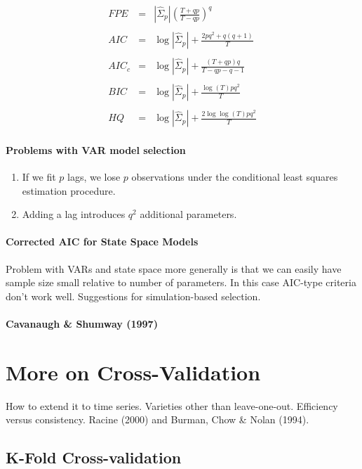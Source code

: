 \documentclass[12pt]{article}
\theoremstyle{definition}
\begin{document}
\begin{eqnarray*}
	FPE &=& \left| \widehat{\Sigma}_p \right| \left( \frac{T + qp}{T - qp}\right)^q\\ \\
	AIC &=& \log \left| \widehat{\Sigma}_p\right| + \frac{2pq^2 + q(q+1)}{T}\\ \\ 
	AIC_c &=& \log \left| \widehat{\Sigma}_p\right|  + \frac{(T + qp)q}{T - qp - q -1}\\ \\
	BIC &=& \log \left| \widehat{\Sigma}_p\right| +  \frac{\log(T)pq^2}{T}\\ \\ 
	HQ &=& \log \left| \widehat{\Sigma}_p\right| +  \frac{2 \log\log(T)pq^2}{T}
\end{eqnarray*}

\paragraph{Problems with VAR model selection}
	\begin{enumerate}
		\item If we fit $p$ lags, we lose $p$ observations under the conditional least squares estimation procedure.
		\item Adding a lag introduces $q^2$ additional parameters. 
	\end{enumerate}

\paragraph{Corrected AIC for State Space Models}
Problem with VARs and state space more generally is that we can easily have sample size small relative to number of parameters. In this case AIC-type criteria don't work well. Suggestions for simulation-based selection.

\paragraph{Cavanaugh \& Shumway (1997)} 


\section{More on Cross-Validation}
How to extend it to time series. Varieties other than leave-one-out. Efficiency versus consistency. Racine (2000) and Burman, Chow \& Nolan (1994).

\subsection{K-Fold Cross-validation}
\end{document}
